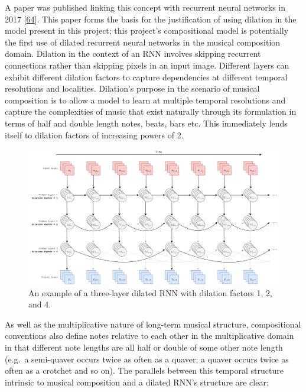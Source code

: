 \documentclass[12pt,]{article}
\begin{document}
A paper was published linking this concept with recurrent neural
networks in 2017 {[}\protect\hyperlink{ref-chang2017dilated}{64}{]}.
This paper forms the basis for the justification of using dilation in
the model present in this project; this project's compositional model is
potentially the first use of dilated recurrent neural networks in the
musical composition domain. Dilation in the context of an RNN involves
skipping recurrent connections rather than skipping pixels in an input
image. Different layers can exhibit different dilation factors to
capture dependencies at different temporal resolutions and localities.
Dilation's purpose in the scenario of musical composition is to allow a
model to learn at multiple temporal resolutions and capture the
complexities of music that exist naturally through its formulation in
terms of half and double length notes, beats, bars etc. This immediately
lends itself to dilation factors of increasing powers of 2.

\begin{figure}
\centering
\includegraphics[width=1\textwidth,height=\textheight]{Images/dilatedrnn.png}
\caption{An example of a three-layer dilated RNN with dilation factors
1, 2, and 4.}
\end{figure}

As well as the multiplicative nature of long-term musical structure,
compositional conventions also define notes relative to each other in
the multiplicative domain in that different note lengths are all half or
double of some other note length (e.g.~a semi-quaver occurs twice as
often as a quaver; a quaver occurs twice as often as a crotchet and so
on). The parallels between this temporal structure intrinsic to musical
composition and a dilated RNN's structure are clear:
\end{document}
